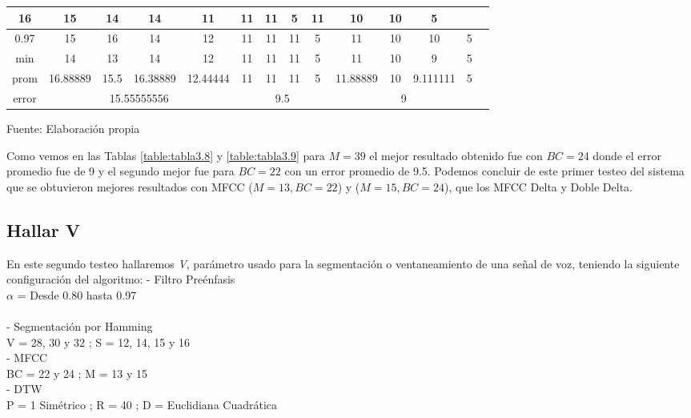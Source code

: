 \begin{center}
\begin{table}[H]
{\begin{tabular}{|c|c|c|c|c|c|c|c|c|c|c|c|c|c|}
16 & 15 & 14 & 14 & 11 & 11 & 11 & 5 & 11 & 10 & 10 & 5 \\
\hline 
0.97 & 
15 & 16 & 14 & 12 & 11 & 11 & 11 & 5 & 11 & 10 & 10 & 5 \\
\hline 
min & 
14 & 13 & 14 & 12 & 11 & 11 & 11 & 5 & 11 & 10 & 9 & 5 \\
\hline 
prom & 
16.88889 & 15.5 & 16.38889 & 12.44444 & 11 & 11 & 11 & 5 & 11.88889 & 10 & 9.111111 & 5 \\
\hline 
error & 
\multicolumn{4}{c|}{15.55555556} & 
\multicolumn{4}{c|}{9.5} & 
\multicolumn{4}{c|}{9}\\ 
\hline 
\end{tabular} 
}
\begin{center}
\vskip 0.2cm
{\small{Fuente: Elaboración propia}}
\end{center}
\end{table}
\end{center}

\vskip -0.5cm
Como vemos en las Tablas \ref{table:tabla3.8} y \ref{table:tabla3.9} para $M = 39$ el mejor resultado obtenido fue con $BC = 24$ donde el error promedio fue de 9 y el segundo mejor fue para $BC = 22$ con un error promedio de 9.5. Podemos concluir de este primer testeo del sistema que se obtuvieron mejores resultados con MFCC ($M = 13, BC = 22$) y ($M = 15, BC = 24$), que los MFCC Delta y Doble Delta.

\subsection{Hallar V}
En este segundo testeo hallaremos \textit{V}, parámetro usado para la segmentación o ventaneamiento de una señal de voz, teniendo la siguiente configuración del algoritmo:
\newpage
- Filtro Preénfasis \\
\hspace*{1cm} $\alpha$ = Desde 0.80 hasta 0.97 \\ \\
- Segmentación por Hamming \\
\hspace*{1cm} V = 28, 30 y 32 ; \qquad S = 12, 14, 15 y 16 \\
- MFCC \\
\hspace*{1cm} BC = 22 y 24 ; \qquad M = 13 y 15 \\
- DTW \\
\hspace*{1cm} P = 1 Simétrico ; \qquad R = 40 ; \qquad D = Euclidiana Cuadrática

